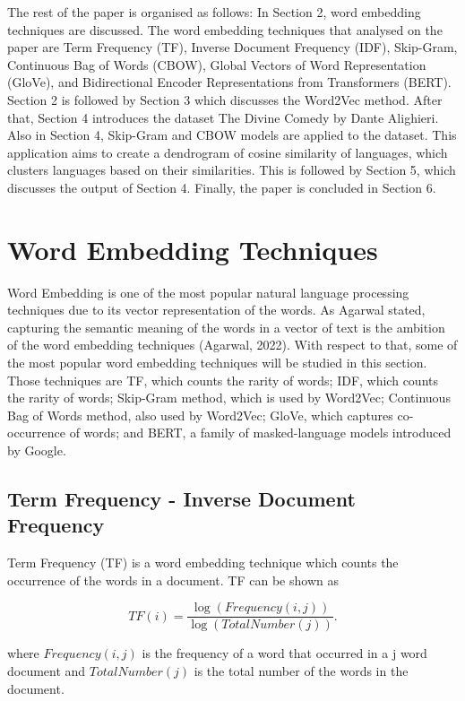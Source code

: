 \documentclass[man]{apa7}
\begin{document}
The rest of the paper is organised as follows: In Section 2, word embedding techniques are discussed. The word embedding techniques that analysed on the paper are Term Frequency (TF), Inverse Document Frequency (IDF), Skip-Gram, Continuous Bag of Words (CBOW), Global Vectors of Word Representation (GloVe), and Bidirectional Encoder Representations from Transformers (BERT). Section 2 is followed by Section 3 which discusses the Word2Vec method. After that, Section 4 introduces the dataset The Divine Comedy by Dante Alighieri. Also in Section 4, Skip-Gram and CBOW models are applied to the dataset. This application aims to create a dendrogram of cosine similarity of languages, which clusters languages based on their similarities. This is followed by Section 5, which discusses the output of Section 4. Finally, the paper is concluded in Section 6.

\section{Word Embedding Techniques}
Word Embedding is one of the most popular natural language processing techniques due to its vector representation of the words. As Agarwal stated, capturing the semantic meaning of the words in a vector of text is the ambition of the word embedding techniques (Agarwal, 2022). With respect to that, some of the most popular word embedding techniques will be studied in this section. Those techniques are TF, which counts the rarity of words; IDF, which counts the rarity of words; Skip-Gram method, which is used by Word2Vec; Continuous Bag of Words method, also used by Word2Vec;  GloVe, which captures co-occurrence of words; and BERT, a family of masked-language models introduced by Google.

\subsection{Term Frequency - Inverse Document Frequency}
Term Frequency (TF) is a word embedding technique which counts the occurrence of the words in a document. TF can be shown as

\begin{equation}
TF(i) =   \frac{\log(Frequency(i,j))}{\log(TotalNumber(j))}.
\end{equation}

where $Frequency(i,j)$ is the frequency of a word that occurred in a j word document and $TotalNumber(j)$ is the total number of the words in the document.
\end{document}
